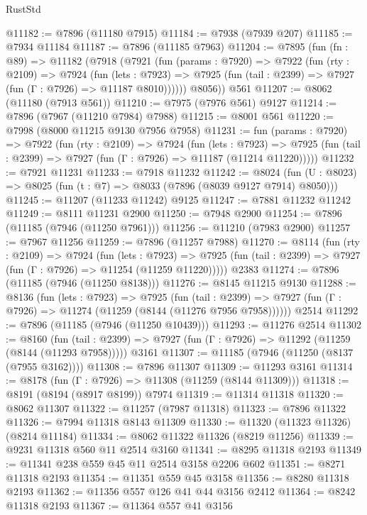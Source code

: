 \begin{lexlean}{RustStd}
\begin{coremodule}
@11182 := @7896 (@11180 @7915)
@11184 := @7938 (@7939 @207)
@11185 := @7934 @11184
@11187 := @7896 (@11185 @7963)
@11204 := @7895
    (fun (fn : @89) =>
    @11182
      (@7918
        (@7921
          (fun (params : @7920) =>
          @7922
            (fun (rty : @2109) =>
            @7924
              (fun (lets : @7923) =>
              @7925 (fun (tail : @2399) => @7927 (fun (Γ : @7926) => @11187 @8010))))))
        @8056))
    @561
@11207 := @8062 (@11180 (@7913 @561))
@11210 := @7975 (@7976 @561) @9127
@11214 := @7896 (@7967 (@11210 @7984) @7988)
@11215 := @8001 @561
@11220 := @7998 (@8000 @11215 @9130 @7956 @7958)
@11231 := fun (params : @7920) =>
  @7922
    (fun (rty : @2109) =>
    @7924
      (fun (lets : @7923) =>
      @7925 (fun (tail : @2399) => @7927 (fun (Γ : @7926) => @11187 (@11214 @11220)))))
@11232 := @7921 @11231
@11233 := @7918 @11232
@11242 := @8024 (fun (U : @8023) => @8025 (fun (t : @7) => @8033 (@7896 (@8039 @9127 @7914) @8050)))
@11245 := @11207 (@11233 @11242) @9125
@11247 := @7881 @11232 @11242
@11249 := @8111 @11231 @2900
@11250 := @7948 @2900
@11254 := @7896 (@11185 (@7946 (@11250 @7961)))
@11256 := @11210 (@7983 @2900)
@11257 := @7967 @11256
@11259 := @7896 (@11257 @7988)
@11270 := @8114
    (fun (rty : @2109) =>
    @7924
      (fun (lets : @7923) =>
      @7925 (fun (tail : @2399) => @7927 (fun (Γ : @7926) => @11254 (@11259 @11220)))))
    @2383
@11274 := @7896 (@11185 (@7946 (@11250 @8138)))
@11276 := @8145 @11215 @9130
@11288 := @8136
    (fun (lets : @7923) =>
    @7925
      (fun (tail : @2399) =>
      @7927 (fun (Γ : @7926) => @11274 (@11259 (@8144 (@11276 @7956 @7958))))))
    @2514
@11292 := @7896 (@11185 (@7946 (@11250 @10439)))
@11293 := @11276 @2514
@11302 := @8160
    (fun (tail : @2399) => @7927 (fun (Γ : @7926) => @11292 (@11259 (@8144 (@11293 @7958)))))
    @3161
@11307 := @11185 (@7946 (@11250 (@8137 (@7955 @3162))))
@11308 := @7896 @11307
@11309 := @11293 @3161
@11314 := @8178 (fun (Γ : @7926) => @11308 (@11259 (@8144 @11309)))
@11318 := @8191 (@8194 (@8917 @8199)) @7974
@11319 := @11314 @11318
@11320 := @8062 @11307
@11322 := @11257 (@7987 @11318)
@11323 := @7896 @11322
@11326 := @7994 @11318 @8143 @11309
@11330 := @11320 (@11323 @11326) (@8214 @11184)
@11334 := @8062 @11322 @11326 (@8219 @11256)
@11339 := @9231 @11318 @560 @11 @2514 @3160
@11341 := @8295 @11318 @2193
@11349 := @11341 @238 @559 @45 @11 @2514 @3158 @2206 @602
@11351 := @8271 @11318 @2193
@11354 := @11351 @559 @45 @3158
@11356 := @8280 @11318 @2193
@11362 := @11356 @557 @126 @41 @44 @3156 @2412
@11364 := @8242 @11318 @2193
@11367 := @11364 @557 @41 @3156

\end{coremodule}
\end{lexlean}
